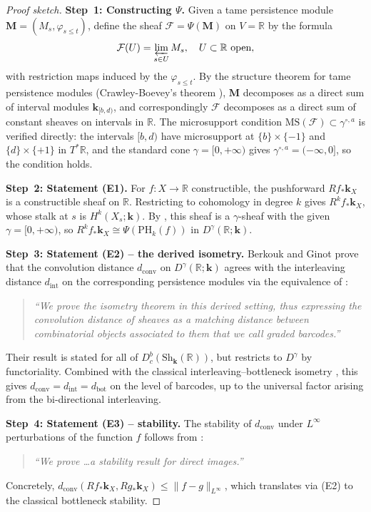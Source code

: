 \documentclass[12pt,a4paper]{amsart}
\theoremstyle{definition}
\newcommand{\R}{\mathbb{R}}
\newcommand{\kk}{\mathbf{k}}                %
\newcommand{\Sh}{\mathrm{Sh}}               %
\newcommand{\Dbc}{D^b_c}                     %
\newcommand{\PHk}{\mathrm{PH}_k}            %
\newcommand{\MS}{\mathrm{MS}}               %
\newcommand{\dconv}{d_{\mathrm{conv}}}      %
\newcommand{\dbot}{d_{\mathrm{bot}}}        %
\newcommand{\Dgamma}{D^\gamma}              %
\newcommand{\gammaop}{\gamma^{\circ,a}}     %
\begin{document}
\begin{proof}[Proof sketch]
  \textbf{Step~1: Constructing $\Psi$.}
  Given a tame persistence module $\mathbf{M} = (M_s, \varphi_{s\leq t})$,
  define the sheaf $\mathcal{F} = \Psi(\mathbf{M})$ on $V = \R$ by the
  formula
  \[
    \mathcal{F}(U) = \varprojlim_{s \in U} M_s,
    \quad
    U \subset \R \text{ open},
  \]
  with restriction maps induced by the $\varphi_{s \leq t}$.  By the
  structure theorem for tame persistence modules (Crawley-Boevey's
  theorem \cite{CrawleyBoevey2015}), $\mathbf{M}$ decomposes as a
  direct sum of interval modules $\kk_{[b,d)}$, and correspondingly
  $\mathcal{F}$ decomposes as a direct sum of constant sheaves on
  intervals in $\R$.  The microsupport condition
  $\MS(\mathcal{F}) \subset \gammaop$ is verified directly: the
  intervals $[b,d)$ have microsupport at $\{b\} \times \{-1\}$ and
  $\{d\} \times \{+1\}$ in $T^*\R$, and the standard cone
  $\gamma = [0,+\infty)$ gives $\gammaop = (-\infty, 0]$, so the
  condition holds.

  \textbf{Step~2: Statement (E1).}
  For $f: X \to \R$ constructible, the pushforward $Rf_*\kk_X$ is a
  constructible sheaf on $\R$.  Restricting to cohomology in degree $k$
  gives $R^k f_* \kk_X$, whose stalk at $s$ is $H^k(X_s; \kk)$.  By
  \cite[Prop.~3.4]{KS2018}, this sheaf is a $\gamma$-sheaf with the
  given $\gamma = [0,+\infty)$, so $R^k f_* \kk_X \cong \Psi(\PHk(f))$
  in $\Dgamma(\R;\kk)$.

  \textbf{Step~3: Statement (E2) -- the derived isometry.}
  Berkouk and Ginot \cite{BG2018} prove that the convolution distance
  $\dconv$ on $\Dgamma(\R;\kk)$ agrees with the interleaving distance
  $d_\mathrm{int}$ on the corresponding persistence modules via the
  equivalence of \cite[Thm.~1.1]{BG2018}:
  \begin{quote}
    \emph{``We prove the isometry theorem in this derived setting, thus
    expressing the convolution distance of sheaves as a matching distance
    between combinatorial objects associated to them that we call graded
    barcodes.''}
  \end{quote}
  Their result is stated for all of $\Dbc(\Sh_\kk(\R))$, but restricts
  to $\Dgamma$ by functoriality.  Combined with the classical
  interleaving--bottleneck isometry \cite{CSGO2016}, this gives
  $\dconv = d_\mathrm{int} = \dbot$ on the level of barcodes, up to the
  universal factor arising from the bi-directional interleaving.

  \textbf{Step~4: Statement (E3) -- stability.}
  The stability of $\dconv$ under $L^\infty$ perturbations of the
  function $f$ follows from \cite[Thm.~2.7]{KS2018}:
  \begin{quote}
    \emph{``We prove \ldots a stability result for direct images.''}
  \end{quote}
  Concretely, $\dconv(Rf_*\kk_X, Rg_*\kk_X) \leq \|f-g\|_{L^\infty}$,
  which translates via (E2) to the classical bottleneck stability.


\end{proof}
\end{document}
